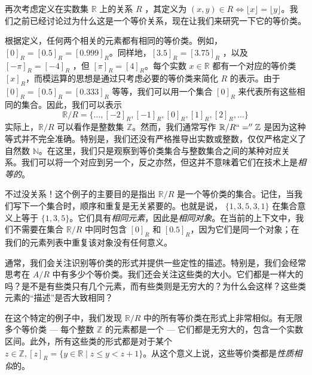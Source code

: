 \begin{example}
    再次考虑定义在实数集 $\mathbb{R}$ 上的关系 $R$ ，其定义为 $(x, y) \in R \iff \lfloor x \rfloor = \lfloor y \rfloor$。我们之前已经讨论过为什么这是一个等价关系，现在让我们来研究一下它的等价类。

    根据定义，任何两个相关的元素都有相同的等价类。例如，$[0]_R = [0.5]_R = [0.999]_R$。同样地，$[3.5]_R = [3.75]_R$ ，以及 $[-\pi]_R = [-4]_R$ ，但 $[\pi]_R = [4]_R$。每个实数 $x \in \mathbb{R}$ 都有一个对应的等价类 $[x]_R$，而模运算的思想是通过只考虑必要的等价类来简化 $R$ 的表示。由于 $[0]_R = [0.5]_R = [0.333]_R$ 等等，我们可以用一个集合 $[0]_R$ 来代表所有这些相同的集合。因此，我们可以表示
    \[\mathbb{R} / R = \{\dots, [-2]_R, [-1]_R, [0]_R, [1]_R, [2]_R, \dots \}\]
    实际上，$\mathbb{R} / R$ 可以看作是整数集 $\mathbb{Z}$。然而，我们通常写作 $\mathbb{R} / R ``='' \mathbb{Z}$ 是因为这种等式并不完全准确。特别是，我们还没有严格推导出实数或整数，仅仅严格定义了自然数 $\mathbb{N}$。在这里，我们只是观察到等价类集合与整数集合之间的某种对应关系。我们可以将一个对应到另一个，反之亦然，但这并不意味着它们在技术上是\emph{相等的}。

    不过没关系！这个例子的主要目的是指出 $\mathbb{R} / R$ 是一个等价类的集合。记住，当我们写下一个集合时，顺序和重复是无关紧要的。也就是说， $\{1, 3, 5, 3, 1\}$ 在集合意义上等于 $\{1, 3, 5\}$。它们具有\emph{相同元素}，因此是\emph{相同对象}。在当前的上下文中，我们不需要在集合  $\mathbb{R} / R$ 中同时包含 $[0]_R$ 和 $[0.5]_R$，因为它们是同一个对象；在我们的元素列表中重复该对象没有任何意义。

    通常，我们会关注识别等价类的形式并提供一些定性的描述。特别是，我们会经常思考在 $A/R$ 中有多少个等价类。我们还会关注这些类的大小。它们都是一样大的吗？是不是有些类只有几个元素，而有些类则是无穷大的？为什么会这样？这些类元素的``描述''是否大致相同？

    在这个特定的例子中，我们发现 $\mathbb{R} / R$ 中的所有等价类在形式上非常相似。有无限多个等价类 --- 每个整数 $\mathbb{Z}$ 的元素都是一个 --- 它们都是无穷大的，包含一个实数区间。此外，所有这些类的形式都是对于某个 $z \in \mathbb{Z}, [z]_R = \{y \in \mathbb{R} \mid z \le y < z + 1\}$。从这个意义上说，这些等价类都是\emph{性质相似}的。
\end{example}

